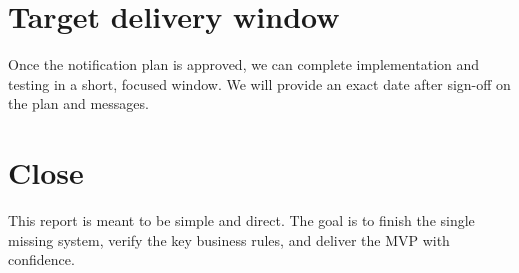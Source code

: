 \section{Target delivery window}
Once the notification plan is approved, we can complete implementation and testing in a short, focused window. We will provide an exact date after sign-off on the plan and messages.

\section{Close}
This report is meant to be simple and direct. The goal is to finish the single missing system, verify the key business rules, and deliver the MVP with confidence.


